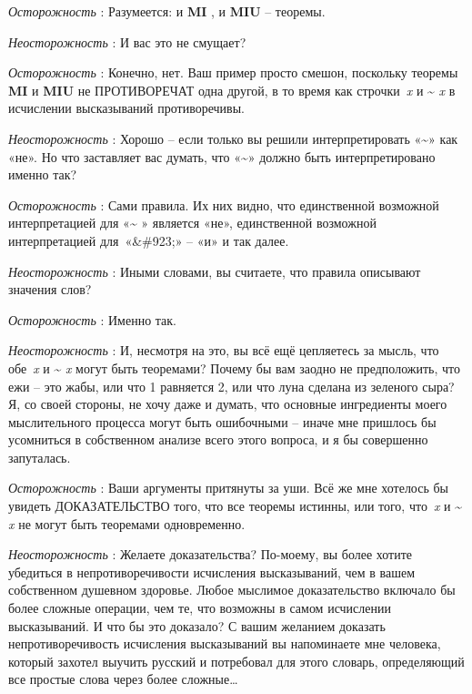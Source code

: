 \documentclass[../main.tex]{subfiles}
\begin{document}
\emph{Осторожность} : Разумеется: и \textbf{MI} , и \textbf{MIU} \--- теоремы.

\emph{Неосторожность} : И вас это не смущает?

\emph{Осторожность} : Конечно, нет. Ваш пример просто смешон, поскольку теоремы \textbf{MI} и \textbf{MIU} не ПРОТИВОРЕЧАТ одна другой, в то время как строчки~\emph{x} и \textbf{\textasciitilde{}} \emph{x} в исчислении высказываний противоречивы.

\emph{Неосторожность} : Хорошо \--- если только вы решили интерпретировать «\textbf{\textasciitilde}» как «не». Но что заставляет вас думать, что «\textbf{\textasciitilde}» должно быть интерпретировано именно так?

\emph{Осторожность} : Сами правила. Их них видно, что единственной возможной интерпретацией для «\textbf{\textasciitilde{}} » является «не», единственной возможной интерпретацией для~«\&\#923;» \--- «и» и так далее.

\emph{Неосторожность} : Иными словами, вы считаете, что правила описывают значения слов?

\emph{Осторожность} : Именно так.

\emph{Неосторожность} : И, несмотря на это, вы всё ещё цепляетесь за мысль, что обе~\emph{x} и \textbf{\textasciitilde{}} \emph{x} могут быть теоремами? Почему бы вам заодно не предположить, что ежи \--- это жабы, или что 1 равняется 2, или что луна сделана из зеленого сыра? Я, со своей стороны, не хочу даже и думать, что основные ингредиенты моего мыслительного процесса могут быть ошибочными \--- иначе мне пришлось бы усомниться в собственном анализе всего этого вопроса, и я бы совершенно запуталась.

\emph{Осторожность} : Ваши аргументы притянуты за уши. Всё же мне хотелось бы увидеть ДОКАЗАТЕЛЬСТВО того, что все теоремы истинны, или того, что~\emph{x} и \textbf{\textasciitilde{}} \emph{x} не могут быть теоремами одновременно.

\emph{Неосторожность} : Желаете доказательства? По-моему, вы более хотите убедиться в непротиворечивости исчисления высказываний, чем в вашем собственном душевном здоровье. Любое мыслимое доказательство включало бы более сложные операции, чем те, что возможны в самом исчислении высказываний. И что бы это доказало? С вашим желанием доказать непротиворечивость исчисления высказываний вы напоминаете мне человека, который захотел выучить русский и потребовал для этого словарь, определяющий все простые слова через более сложные\ldots{}
\end{document}
